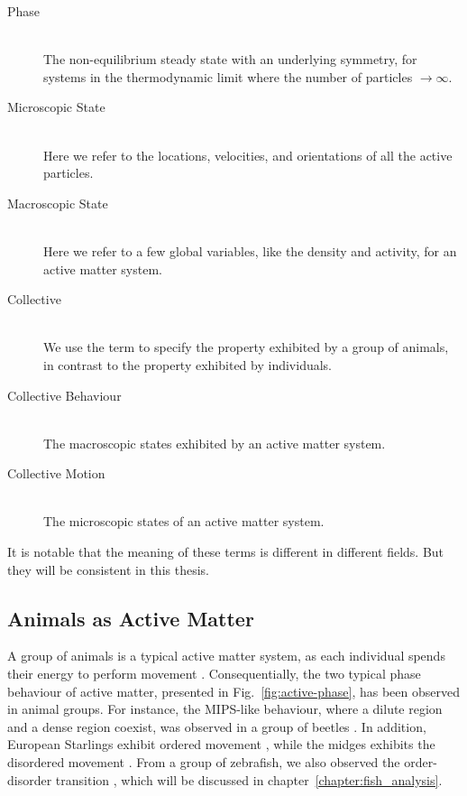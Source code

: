 \documentclass[11pt,twoside]{report}
\begin{document}
\begin{tcolorbox}[
enlarge bottom by=0.5em,
enlarge top by=0.5em,
]

\begin{description}
	\item [Phase] \hfill \\
	The non-equilibrium steady state with an underlying symmetry, for systems in the thermodynamic limit where the number of particles $\rightarrow \infty$.
	\item [Microscopic State] \hfill \\ Here we refer to the locations, velocities, and orientations of all the active particles. 
	\item [Macroscopic State] \hfill \\ Here we refer to a few global variables, like the density and activity, for an active matter system.
	\item [Collective] \hfill \\ We use the term to specify the property exhibited by a group of animals, in contrast to the property exhibited by individuals.
	\item [Collective Behaviour] \hfill \\ The macroscopic states exhibited by an active matter system.
	\item [Collective Motion] \hfill \\ The microscopic states of an active matter system.
\end{description}

\end{tcolorbox}

\noindent It is notable that the meaning of these terms is different in different fields. But they will be consistent in this thesis.

\subsection{Animals as Active Matter}

A group of animals is a typical active matter system, as each individual spends their energy to perform movement \cite{ramaswamy2017}.
Consequentially, the two typical phase behaviour of active matter, presented in Fig.~\ref{fig:active-phase}, has been observed in animal groups.
For instance, the MIPS-like behaviour, where a dilute region and a dense region coexist, was observed in a group of beetles \cite{devereux2021}.
In addition, European Starlings exhibit ordered movement \cite{cavagna2010}, while the midges exhibits the disordered movement \cite{attanasi2014pcb}. From a group of zebrafish, we also observed the order-disorder transition \cite{yang2021pcb}, which will be discussed in chapter~\ref{chapter:fish_analysis}.
\end{document}
